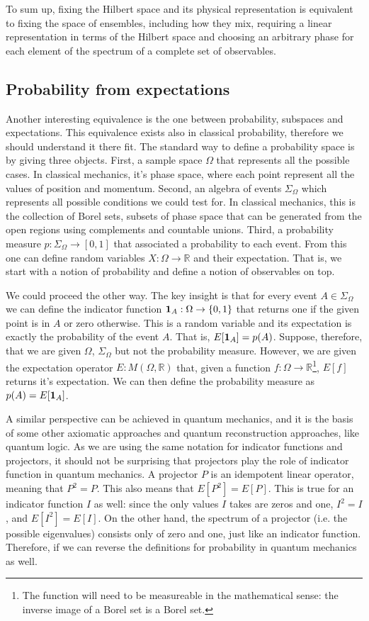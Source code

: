 To sum up, fixing the Hilbert space and its physical representation is equivalent to fixing the space of ensembles, including how they mix, requiring a linear representation in terms of the Hilbert space and choosing an arbitrary phase for each element of the spectrum of a complete set of observables.

\subsection{Probability from expectations}

Another interesting equivalence is the one between probability, subspaces and expectations. This equivalence exists also in classical probability, therefore we should understand it there fit. The standard way to define a probability space is by giving three objects. First, a sample space $\Omega$ that represents all the possible cases. In classical mechanics, it's phase space, where each point represent all the values of position and momentum. Second, an algebra of events $\Sigma_{\Omega}$ which represents all possible conditions we could test for. In classical mechanics, this is the collection of Borel sets, subsets of phase space that can be generated from the open regions using complements and countable unions. Third, a probability measure $p : \Sigma_{\Omega} \to [0,1]$ that associated a probability to each event. From this one can define random variables $X : \Omega \to \mathbb{R}$ and their expectation. That is, we start with a notion of probability and define a notion of observables on top.

We could proceed the other way. The key insight is that for every event $A \in \Sigma_{\Omega}$ we can define the indicator function $\indicator[A] : \Omega \to \{0,1\}$ that returns one if the given point is in $A$ or zero otherwise. This is a random variable and its expectation is exactly the probability of the event $A$. That is, $E[\indicator[A]] = p(A)$. Suppose, therefore, that we are given $\Omega$, $\Sigma_{\Omega}$ but not the probability measure. However, we are given the expectation operator $E : M(\Omega, \mathbb{R})$ that, given a function $f : \Omega \to \mathbb{R}$\footnote{The function will need to be measureable in the mathematical sense: the inverse image of a Borel set is a Borel set.}, $E[f]$ returns it's expectation. We can then define the probability measure as $p(A) = E[\indicator[A]]$.

A similar perspective can be achieved in quantum mechanics, and it is the basis of some other axiomatic approaches and quantum reconstruction approaches, like quantum logic. As we are using the same notation for indicator functions and projectors, it should not be surprising that projectors play the role of indicator function in quantum mechanics. A projector $P$ is an idempotent linear operator, meaning that $P^2 = P$. This also means that $E[P^2] = E[P]$. This is true for an indicator function $I$ as well: since the only values $I$ takes are zeros and one, $I^2=I$, and $E[I^2] = E[I]$. On the other hand, the spectrum of a projector (i.e. the possible eigenvalues) consists only of zero and one, just like an indicator function. Therefore, if we can reverse the definitions for probability in quantum mechanics as well.

